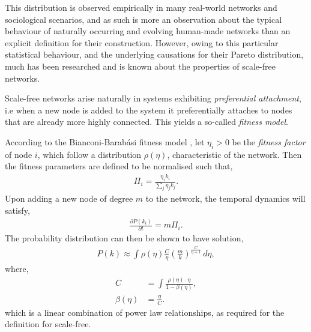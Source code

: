 This distribution is observed empirically in many real-world networks and sociological scenarios, and as such is more an observation about the typical behaviour of naturally occurring and evolving human-made networks than an explicit definition for their construction. However, owing to this particular statistical behaviour, and the underlying causations for their Pareto distribution, much has been researched and is known about the properties of scale-free networks.

Scale-free networks arise naturally in systems exhibiting \textit{preferential attachment}, i.e when a new node is added to the system it preferentially attaches to nodes that are already more highly connected. This yields a so-called \textit{fitness model}.

According to the Bianconi-Barab{\'a}si fitness model \cite{bib:BBfitness, bib:BAfitness}, let \mbox{$\eta_i>0$} be the \textit{fitness factor} of node $i$, which follow a distribution $\rho(\eta)$, characteristic of the network. Then the fitness parameters are defined to be normalised such that,
\begin{align}
\Pi_i = \frac{\eta_i k_i}{\sum_j \eta_j k_j}.	
\end{align}
Upon adding a new node of degree $m$ to the network, the temporal dynamics will satisfy,
\begin{align}
\frac{\partial P(k_i)}{\partial t}= m\Pi_i.	
\end{align}
The probability distribution can then be shown to have solution,
\begin{align}
P(k) \approx \int \rho(\eta)\frac{C}{\eta}\left(\frac{m}{k}\right)^\frac{C}{\eta+1}\,d\eta,
\end{align}
where,
\begin{align}
	C &= \int \frac{\rho(\eta)\cdot\eta}{1-\beta(\eta)},\nonumber\\
	\beta(\eta) &= \frac{\eta}{C}.
\end{align}
which is a linear combination of power law relationships, as required for the definition for scale-free.


